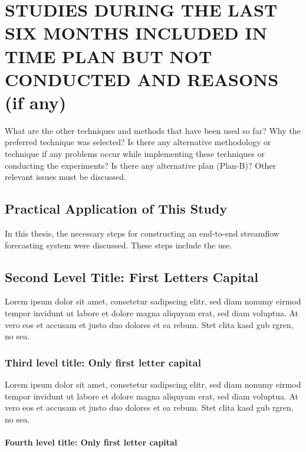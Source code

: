 \chapter{STUDIES DURING THE LAST SIX MONTHS INCLUDED IN TIME PLAN BUT NOT CONDUCTED AND REASONS (if any)}\label{Ch5}

What are the other techniques and methods that have been used so far? Why the preferred technique was selected? Is there any alternative methodology or technique if any problems occur while implementing these techniques or conducting the experiments? Is there any alternative plan (Plan-B)? Other relevant issues must be discussed. 

\section{Practical Application of This Study}

In this thesis, the necessary steps for constructing an end-to-end streamflow forecasting system were discussed. These steps include the use.

\section{Second Level Title: First Letters Capital}

Lorem ipsum dolor sit amet, consetetur sadipscing elitr, sed diam nonumy eirmod tempor invidunt ut labore et dolore magna aliquyam erat, sed diam voluptua. At vero eos et accusam et justo duo dolores et ea rebum. Stet clita kasd gub rgren, no sea.

\subsection{Third level title: Only first letter capital}

Lorem ipsum dolor sit amet, consetetur sadipscing elitr, sed diam nonumy eirmod tempor invidunt ut labore et dolore magna aliquyam erat, sed diam voluptua. At vero eos et accusam et justo duo dolores et ea rebum. Stet clita kasd gub rgren, no sea.

\subsubsection{Fourth level title: Only first letter capital}

